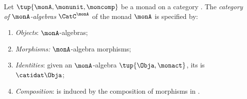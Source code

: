 \begin{ctdefinition}
    \label{def:catofmonadalgebras}
    Let $\tup{\monA, \monunit, \moncomp}$ be a monad on a category \CatC.
    The \emph{category of $\monA$-algebras} $\CatC^\monA$ of the monad $\monA$ is specified by:
    \begin{enumerate}
        \item \emph{Objects}: $\monA$-algebras;
        \item \emph{Morphisms:} $\monA$-algebra morphisms;
        \item \emph{Identities}: given an $\monA$-algebra $\tup{\Obja, \monact}$, its  is $\catidat\Obja$;
        \item \emph{Composition}: is induced by the composition of morphisms in \CatC.
    \end{enumerate}
\end{ctdefinition}

